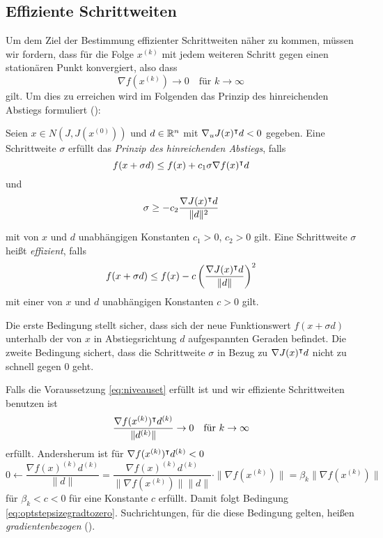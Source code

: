 \subsection{Effiziente Schrittweiten}
Um dem Ziel der Bestimmung effizienter Schrittweiten näher zu kommen, müssen wir fordern, dass für die Folge $x^{(k)}$ mit jedem weiteren Schritt gegen einen stationären Punkt konvergiert, also dass  
\begin{equation}
\label{eq:optstepsizegradtozero}
 \nabla f(x^{(k)})\to 0 \quad \text{für }k\to \infty
\end{equation}
gilt.
Um dies zu erreichen wird im Folgenden das Prinzip des hinreichenden Abstiegs formuliert (\cite[Def. 4.4.2]{alt2002nichtlineare}):
\begin{definition}
\label{def:sufficientdescent}
 Seien $x\in N(J,J(x^{(0)}))$ und $d\in \mathbb{R}^n$ mit $\nabla_u J(x)^\intercal d<0$ gegeben. Eine Schrittweite $\sigma$ erfüllt das \textit{Prinzip des hinreichenden Abstiegs}, falls
 \begin{equation}
 \label{eq:armijo1}
  f(x+\sigma d) \leq f(x) + c_1\sigma \nabla f(x)^\intercal d
 \end{equation}
 und 
 \begin{equation}
\label{eq:armijo2}
 \sigma \geq -c_2 \frac{\nabla J(x)^\intercal d}{\|d\|^2}
 \end{equation}


mit von $x$ und $d$ unabhängigen Konstanten $c_1>0$, $c_2>0$ gilt. Eine Schrittweite $\sigma$ heißt \textit{effizient}, falls
\[
 f(x+\sigma d) \leq f(x) - c\left( \frac{\nabla J(x)^\intercal d}{\|d\|}\right)^2
\]
mit einer von $x$ und $d$ unabhängigen Konstanten $c>0$ gilt.
\end{definition}
Die erste Bedingung stellt sicher, dass sich der neue Funktionswert $f(x+\sigma d)$ unterhalb der von $x$ in Abstiegsrichtung $d$ aufgespannten Geraden befindet. 
Die zweite Bedingung sichert, dass die Schrittweite $\sigma$ in Bezug zu $\nabla J(x)^\intercal d$ nicht zu schnell gegen $0$ geht.

Falls die Voraussetzung \eqref{eq:niveauset} erfüllt ist und wir effiziente Schrittweiten benutzen ist
\[
 \frac{\nabla f(x^{(k)})^\intercal d^{(k)}}{\|d^{(k)}\|} \to 0 \quad \text{für }k\to \infty
\]
erfüllt. Andersherum ist für $\nabla f(x^{(k)})^\intercal d^{(k)}<0$
\[
 0 \leftarrow \frac{\nabla f(x)^{(k)} d^{(k)}}{\|d\|} = \frac{\nabla f(x)^{(k)} d^{(k)}}{\|\nabla f(x^{(k)})\|\|d\|}\cdot \|\nabla f(x^{(k)})\| = \beta_k \|\nabla f(x^{(k)})\|
\]
für $\beta_k<c<0$ für eine Konstante $c$ erfüllt. Damit folgt Bedingung \eqref{eq:optstepsizegradtozero}. Suchrichtungen, für die diese Bedingung gelten, heißen \textit{gradientenbezogen} (\cite[Def. 4.4.4]{alt2002nichtlineare}).

